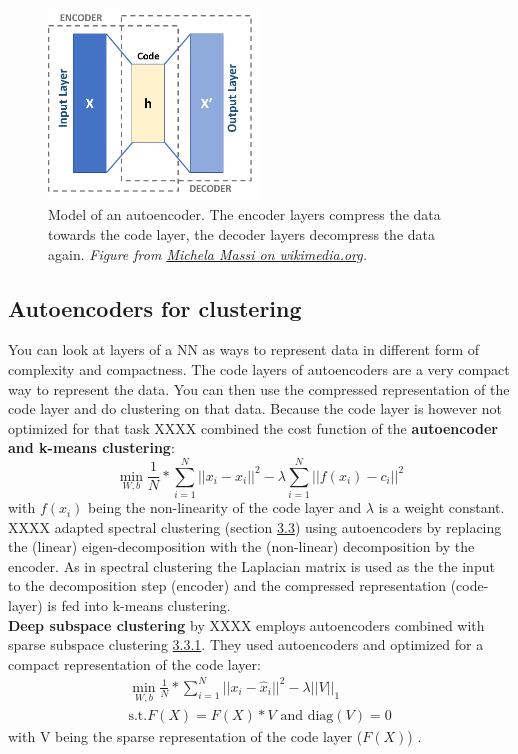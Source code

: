 \documentclass[
]{book}
\begin{document}
\begin{figure}
\centering
\includegraphics[width=0.5\textwidth,height=\textheight]{./figures/Autoencoder_schema.png}
\caption{Model of an autoencoder. The encoder layers compress the data towards
the code layer, the decoder layers decompress the data again. \emph{Figure
from \href{https://commons.wikimedia.org/wiki/File:Autoencoder_schema.png}{Michela Massi on
wikimedia.org}.}}
\end{figure}

\hypertarget{autoencoders-for-clustering}{%
\subsection{Autoencoders for clustering}\label{autoencoders-for-clustering}}

You can look at layers of a NN as ways to represent data in different
form of complexity and compactness. The code layers of autoencoders are
a very compact way to represent the data. You can then use the
compressed representation of the code layer and do clustering on that
data. Because the code layer is however not optimized for that task XXXX
combined the cost function of the \textbf{autoencoder and k-means
clustering}:
\[\min_{W,b} \frac{1}{N}*\sum_{i=1}^N ||x_i - \hat{x}_i||^2 - \lambda \sum_{i=1}^N ||f(x_i) - c_i||^2\]
with \(f(x_i)\) being the non-linearity of the code layer and \(\lambda\) is
a weight constant.\\
XXXX adapted spectral clustering (section
\protect\hyperlink{Spectralux5cux2520Clustering}{3.3}) using autoencoders by replacing the
(linear) eigen-decomposition with the (non-linear) decomposition by the
encoder. As in spectral clustering the Laplacian matrix is used as the
the input to the decomposition step (encoder) and the compressed
representation (code-layer) is fed into k-means clustering.\\
\textbf{Deep subspace clustering} by XXXX employs autoencoders combined with
sparse subspace clustering \protect\hyperlink{SSP}{3.3.1}. They used autoencoders and optimized for a compact
representation of the code layer: \[\begin{split}
                \min_{W,b} \frac{1}{N}*\sum_{i=1}^N ||x_i - \hat{x}_i||^2 - \lambda ||V||_1 \\
                \text{s.t.} F(X) = F(X)*V \text{ and diag}(V)=0
            \end{split}\] with V being the sparse representation of the
code layer (\(F(X)\)) .
\end{document}
